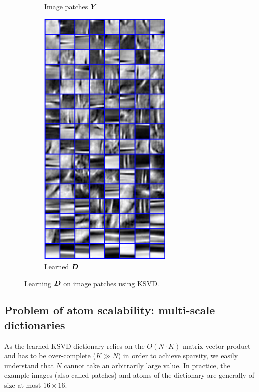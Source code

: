 \begin{figure}[!ht]
\begin{subfigure}[b]{0.29\textwidth}
	\caption{Image patches $\bm{Y}$}\label{fig_ksvd_patches}
\end{subfigure}
\begin{subfigure}[b]{0.29\textwidth}\centering
	\includegraphics[width=0.7\textwidth]{figures/ksvd/dictionary.pdf}
	\caption{Learned $\bm{D}$}\label{fig_ksvd_dict}
\end{subfigure}
\caption{Learning $\bm{D}$ on image patches using \ac{KSVD}.}\label{fig_ksvd}
\end{figure}


\subsection{Problem of atom scalability: multi-scale dictionaries}
As the learned \ac{KSVD} dictionary relies on the $O(N \cdot K)$ matrix-vector product and has to be over-complete ($K \gg N$) in order to achieve sparsity, we easily understand that $N$ cannot take an arbitrarily large value. In practice, the example images (also called patches) and atoms of the dictionary are generally of size at most $16 \times 16$.

